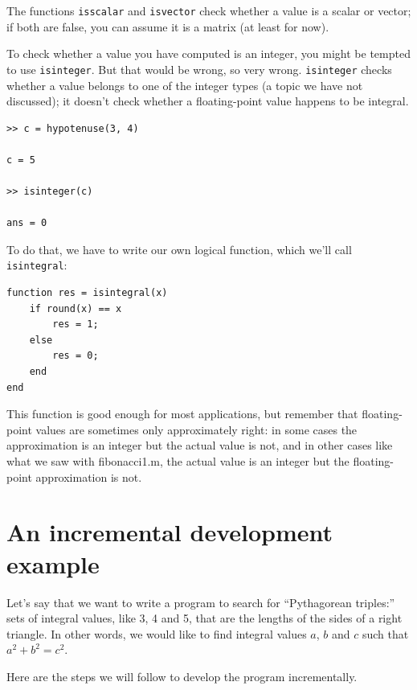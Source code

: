 \documentclass{book}
\begin{document}
The functions {\tt isscalar} and {\tt isvector} check whether
a value is a scalar or vector; if both are false, you can assume
it is a matrix (at least for now).

To check whether a value you have computed is an integer, you might
be tempted to use {\tt isinteger}.  But that would be wrong, so very
wrong.  {\tt isinteger} checks whether a value belongs to one of
the integer types (a topic we have not discussed); it doesn't check
whether a floating-point value happens to be integral.

\begin{verbatim}
>> c = hypotenuse(3, 4)

c = 5

>> isinteger(c)

ans = 0
\end{verbatim}

To do that, we have to write our own logical function, which
we'll call {\tt isintegral}:

\begin{verbatim}
function res = isintegral(x)
    if round(x) == x
        res = 1;
    else
        res = 0;
    end
end
\end{verbatim}

This function is good enough for most applications, but remember
that floating-point values are
sometimes
only approximately right: in some
cases the approximation is an integer but the actual
value is not,
and in other cases like what we saw with fibonacci1.m,
the actual value is an integer but the floating-point
approximation is not.


\section{An incremental development example}
\label{increxample}

Let's say that we want to write a program to search for ``Pythagorean
triples:'' sets of integral values, like 3, 4 and 5,
that are the lengths of the sides of a right triangle.  In other
words, we would like to find integral values $a$, $b$ and $c$ such
that $a^2 + b^2 = c^2$.

Here are the steps we will follow to develop the program incrementally.
\end{document}

